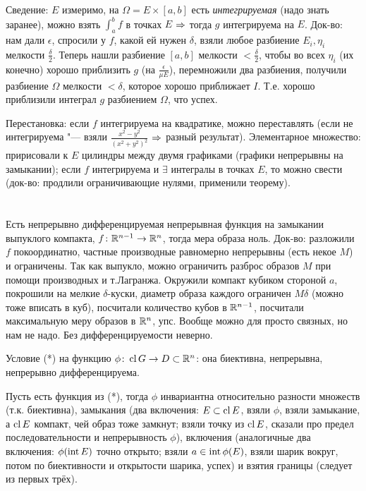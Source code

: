 \section{} %
Сведение: $E$ измеримо, на $\Omega=E\times[a,b]$ есть \textit{интегрируемая} (надо знать заранее), можно взять $\int_a^b f$ в точках $E$ $\Rightarrow$ тогда $g$ интегрируема на $E$.
Док-во: нам дали $\epsilon$, спросили у $f$, какой ей нужен $\delta$, взяли любое разбиение $E_i, \eta_i$ мелкости $\frac \delta 2$.
Теперь нашли разбиение $[a,b]$ мелкости $<\frac\delta 2$, чтобы во всех $\eta_i$ (их конечно) хорошо приблизить $g$ (на $\frac{\epsilon}{\mu E}$), перемножили
два разбиения, получили разбиение $\Omega$ мелкости $<\delta$, которое хорошо приближает $I$.
Т.е. хорошо приблизили интеграл $g$ разбиением $\Omega$, что успех.

Перестановка: если $f$ интегрируема на квадратике, можно переставлять (если не интегрируема "--- взяли $\frac{x^2-y^2}{(x^2+y^2)^2}$ $\Rightarrow$ разный результат).
Элементарное множество: пририсовали к $E$ цилиндры между двумя графиками (графики непрерывны на замыкании);
если $f$ интегрируема и $\exists$ интегралы в точках $E$, то можно свести (док-во: продлили ограничивающие нулями, применили теорему).

\section{} %
Есть непрерывно дифференцируемая непрерывная функция на замыкании выпуклого компакта, $f \colon \mathbb{R}^{n-1} \to \mathbb{R}^n$, тогда мера образа ноль.
Док-во: разложили $f$ покоординатно, частные производные равномерно непрерывны (есть некое $M$) и ограничены.
Так как выпукло, можно ограничить разброс образов $M$ при помощи производных и т.Лагранжа.
Окружили компакт кубиком стороной $a$, покрошили на мелкие $\delta$-куски, диаметр образа каждого ограничен $M \delta$ (можно тоже вписать в куб), посчитали количество кубов в $\mathbb{R}^{n-1}$,
посчитали максимальную меру образов в $\mathbb{R}^n$, упс.
Вообще можно для просто связных, но нам не надо.
Без дифференцируемости неверно.

Условие (*) на функцию $\phi \colon \operatorname{cl} G \to D \subset \mathbb{R}^n$: она биективна, непрерывна, непрерывно дифференцируема.

Пусть есть функция из (*), тогда $\phi$ инвариантна относительно
разности множеств (т.к. биективна),
замыкания (два включения: $E \subset \operatorname{cl} E$, взяли $\phi$, взяли замыкание, а $\operatorname{cl} E$ компакт, чей образ тоже замкнут; взяли точку из $\operatorname{cl} E$, сказали про предел последовательности и непрерывность $\phi$),
включения (аналогичные два включения: $\phi(\operatorname{int} E)$ точно открыто; взяли $a \in \operatorname{int} \phi(E)$, взяли шарик вокруг, потом по биективности и открытости шарика, успех)
и взятия границы (следует из первых трёх).

